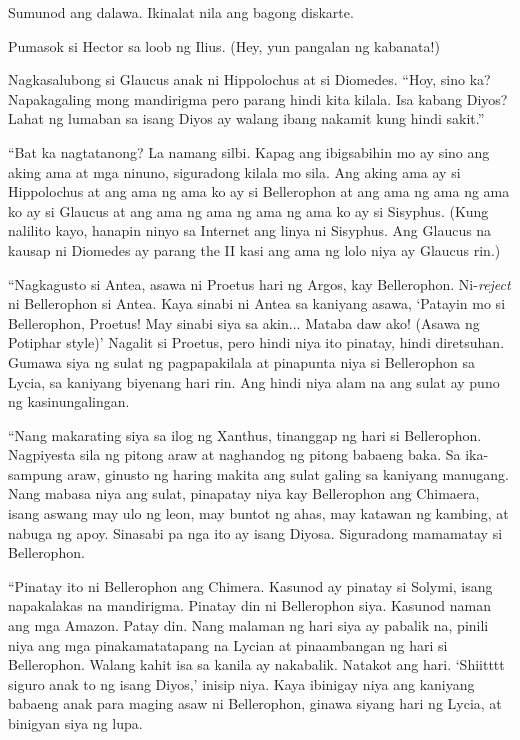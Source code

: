 \documentclass[12pt,letterpaper]{report}
\begin{document}
Sumunod ang dalawa. Ikinalat nila ang bagong diskarte.

Pumasok si Hector sa loob ng Ilius. (Hey, yun pangalan ng kabanata!)

Nagkasalubong si Glaucus anak ni Hippolochus at si Diomedes. ``Hoy, sino ka? Napakagaling mong mandirigma pero parang hindi kita kilala. Isa kabang Diyos? Lahat ng lumaban sa isang Diyos ay walang ibang nakamit kung hindi sakit.''

``Bat ka nagtatanong? La namang silbi. Kapag ang ibigsabihin mo ay sino ang aking ama at mga ninuno, siguradong kilala mo sila. Ang aking ama ay si Hippolochus at ang ama ng ama ko ay si Bellerophon at ang ama ng ama ng ama ko ay si Glaucus at ang ama ng ama ng ama ng ama ko ay si Sisyphus. (Kung nalilito kayo, hanapin ninyo sa Internet ang linya ni Sisyphus. Ang Glaucus na kausap ni Diomedes ay parang the II kasi ang ama ng lolo niya ay Glaucus rin.)

``Nagkagusto si Antea, asawa ni Proetus hari ng Argos, kay Bellerophon. Ni-\textit{reject} ni Bellerophon si Antea. Kaya sinabi ni Antea sa kaniyang asawa, `Patayin mo si Bellerophon, Proetus! May sinabi siya sa akin...  Mataba daw ako! (Asawa ng Potiphar style)' Nagalit si Proetus, pero hindi niya ito pinatay, hindi diretsuhan. Gumawa siya ng sulat ng pagpapakilala at pinapunta niya si Bellerophon sa Lycia, sa kaniyang biyenang hari rin. Ang hindi niya alam na ang sulat ay puno ng kasinungalingan.

``Nang makarating siya sa ilog ng Xanthus, tinanggap ng hari si Bellerophon. Nagpiyesta sila ng pitong araw at naghandog ng pitong babaeng baka. Sa ika-sampung araw, ginusto ng haring makita ang sulat galing sa kaniyang manugang. Nang mabasa niya ang sulat, pinapatay niya kay Bellerophon ang Chimaera, isang aswang may ulo ng leon, may buntot ng ahas, may katawan ng kambing, at nabuga ng apoy. Sinasabi pa nga ito ay isang Diyosa. Siguradong mamamatay si Bellerophon.

``Pinatay ito ni Bellerophon ang Chimera. Kasunod ay pinatay si Solymi, isang napakalakas na mandirigma. Pinatay din ni Bellerophon siya. Kasunod naman ang mga Amazon. Patay din. Nang malaman ng hari siya ay pabalik na, pinili niya ang mga pinakamatatapang na Lycian at pinaambangan ng hari si Bellerophon. Walang kahit isa sa kanila ay nakabalik. Natakot ang hari. `Shiitttt siguro anak to ng isang Diyos,' inisip niya. Kaya ibinigay niya ang kaniyang babaeng anak para maging asaw ni Bellerophon, ginawa siyang hari ng Lycia, at binigyan siya ng lupa.
\end{document}
